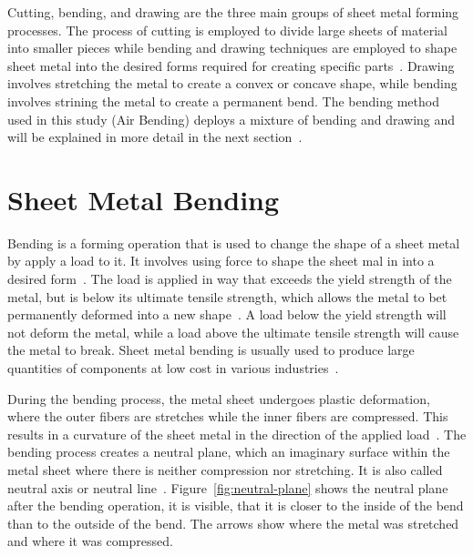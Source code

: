 Cutting, bending, and drawing are the three main groups of sheet metal forming processes.
The process of cutting is employed to divide large sheets of material into smaller pieces while bending and drawing
techniques are employed to shape sheet metal into the desired forms required for creating specific
parts~\cite[pp. 405]{groover_fundamentalsmodernmanufacturing_2020}.
Drawing involves stretching the metal to create a convex or concave shape, while bending involves strining the metal
to create a permanent bend.
The bending method used in this study (Air Bending) deploys a mixture of bending and drawing and will be
explained in more detail in the next section~\cite[pp. 416]{groover_fundamentalsmodernmanufacturing_2020}.


\section{Sheet Metal Bending}\label{sec:bending}
Bending is a forming operation that is used to change the shape of a sheet metal by
apply a load to it.
It involves using force to shape the sheet mal in into a desired form~\cite[p. 1]{dib_singleensembleclassifiers_2020}.
The load is applied in way that exceeds the yield strength of the metal, but is below its
ultimate tensile strength, which allows the metal to bet permanently deformed into a
new shape~\cite[p. 1]{baig_machinelearningprediction_2021}.
A load below the yield strength will not deform the metal, while a load above the ultimate tensile strength will
cause the metal to break.
Sheet metal bending is usually used to produce large quantities of components at low cost in various
industries~\cite[p. 1]{dib_singleensembleclassifiers_2020}.

During the bending process, the metal sheet undergoes plastic deformation, where the outer fibers are stretches while
the inner fibers are compressed.
This results in a curvature of the sheet metal in the direction of the applied
load~\cite[p. 3]{baig_machinelearningprediction_2021}.
The bending process creates a neutral plane, which an imaginary surface within the metal sheet where there is
neither compression nor stretching.
It is also called neutral axis or neutral line~\cite[pp. 67]{gustafson1998analytical}.
Figure~\ref{fig:neutral-plane} shows the neutral plane after the bending operation, it is
visible, that it is closer to the inside of the bend than to the outside of the bend.
The arrows show where the metal was stretched and where it was compressed.

